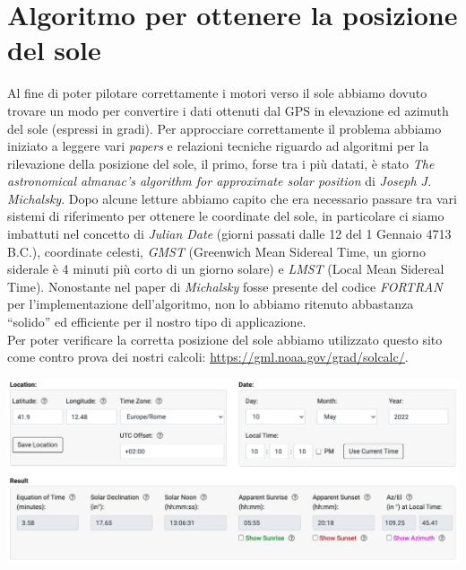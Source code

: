 \hypertarget{algoritmo-per-ottenere-la-posizione-del-sole}{%
\section{Algoritmo per ottenere la posizione del
sole}\label{algoritmo-per-ottenere-la-posizione-del-sole}}

\noindent Al fine di poter pilotare correttamente i motori verso il sole abbiamo
dovuto trovare un modo per convertire i dati ottenuti dal GPS in
elevazione ed azimuth del sole (espressi in gradi). Per approcciare
correttamente il problema abbiamo iniziato a leggere vari \emph{papers}
e relazioni tecniche riguardo ad algoritmi per la rilevazione della
posizione del sole, il primo, forse tra i più datati, è stato \emph{The
astronomical almanac's algorithm for approximate solar position} di
\emph{Joseph J. Michalsky}. Dopo alcune letture abbiamo capito che era
necessario passare tra vari sistemi di riferimento per ottenere le
coordinate del sole, in particolare ci siamo imbattuti nel concetto di
\emph{Julian Date} (giorni passati dalle 12 del 1 Gennaio 4713 B.C.),
coordinate celesti, \emph{GMST} (Greenwich Mean Sidereal Time, un giorno
siderale è 4 minuti più corto di un giorno solare) e \emph{LMST} (Local
Mean Sidereal Time). Nonostante nel paper di \emph{Michalsky} fosse
presente del codice \emph{FORTRAN} per l'implementazione dell'algoritmo,
non lo abbiamo ritenuto abbastanza ``solido'' ed efficiente per il
nostro tipo di applicazione.\\
Per poter verificare la corretta posizione del sole abbiamo utilizzato
questo sito come contro prova dei nostri calcoli:
\href{https://gml.noaa.gov/grad/solcalc/}{\underline{https://gml.noaa.gov/grad/solcalc/}}.

\begin{center}
\includegraphics[scale=0.4]{figures/image72.png}
\captionsetup{type=figure}
\end{center}


